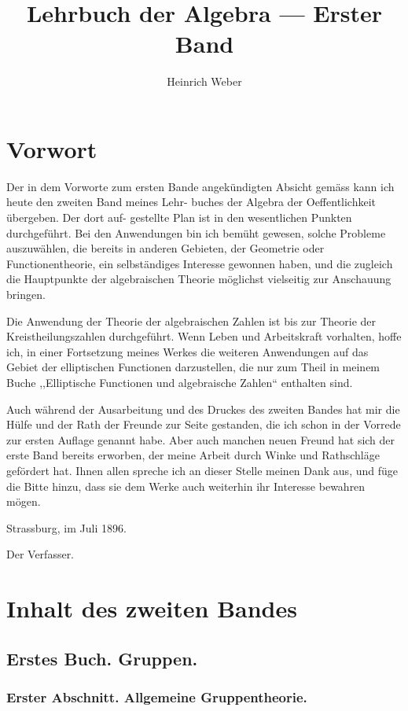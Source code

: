 \documentclass[12pt,a4paper]{article}
\title{Lehrbuch der Algebra --- Erster Band}
\author{Heinrich Weber}
\date{}
\theoremstyle{plain}
\theoremstyle{definition}
\theoremstyle{remark}
\begin{document}
\maketitle

\section*{Vorwort}

Der in dem Vorworte zum ersten Bande angekündigten
Absicht gemäss kann ich heute den zweiten Band meines Lehr-
buches der Algebra der Oeffentlichkeit übergeben. Der dort auf-
gestellte Plan ist in den wesentlichen Punkten durchgeführt.
Bei den Anwendungen bin ich bemüht gewesen, solche Probleme
auszuwählen, die bereits in anderen Gebieten, der Geometrie oder
Functionentheorie, ein selbständiges Interesse gewonnen haben,
und die zugleich die Hauptpunkte der algebraischen Theorie
möglichst vielseitig zur Anschauung bringen.

Die Anwendung der Theorie der algebraischen Zahlen ist
bis zur Theorie der Kreistheilungszahlen durchgeführt. Wenn
Leben und Arbeitskraft vorhalten, hoffe ich, in einer Fortsetzung
meines Werkes die weiteren Anwendungen auf das Gebiet der
elliptischen Functionen darzustellen, die nur zum Theil in
meinem Buche ,,Elliptische Functionen und algebraische Zahlen``
enthalten sind.

Auch während der Ausarbeitung und des Druckes des
zweiten Bandes hat mir die Hülfe und der Rath der Freunde
zur Seite gestanden, die ich schon in der Vorrede zur ersten
Auflage genannt habe. Aber auch manchen neuen Freund hat
sich der erste Band bereits erworben, der meine Arbeit durch
Winke und Rathschläge gefördert hat. Ihnen allen spreche ich
an dieser Stelle meinen Dank aus, und füge die Bitte hinzu,
dass sie dem Werke auch weiterhin ihr Interesse bewahren
mögen.

\hfill Strassburg, im Juli 1896.

\hfill Der Verfasser.

\newpage

\section*{Inhalt des zweiten Bandes}

\subsection*{Erstes Buch. Gruppen.}

\subsubsection*{Erster Abschnitt. Allgemeine Gruppentheorie.}
\end{document}
